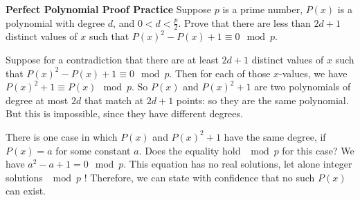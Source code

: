 \question \textbf{Perfect Polynomial Proof Practice} \newline
Suppose $p$ is a prime number, $P(x)$ is a polynomial with degree $d$, and $0 < d < \frac{p}{2}$.
Prove that there are less than $2d +1$ distinct values of $x$ such that $P(x)^2 - P(x) +1 \equiv 0 \mod p$. 
\begin{solution}
Suppose for a contradiction that there are at least $2d + 1$ distinct values of $x$ such that $P(x)^2 − P(x) +1 \equiv 0 \mod p$. Then for each of those $x$-values, we have $P(x)^2 +1 \equiv P(x) \mod p$. So $P(x)$ and $P(x)^2 +1$ are two polynomials of degree at most $2d$ that match at $2d + 1$ points: so they are the same polynomial. But this is impossible, since they have different degrees.\newline

There is one case in which $P(x)$ and $P(x)^2 +1$ have the same degree, if $P(x) = a$ for some constant $a$. Does the equality hold $\mod p$ for this case? We have $a^2 − a + 1 = 0 \mod p$. This equation has no real solutions, let alone integer solutions $\mod p$ ! Therefore, we can state with confidence that no such $P(x)$ can exist.

\end{solution}